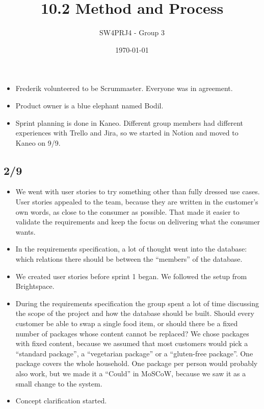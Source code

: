 \documentclass[a4paper,11pt]{article}
\title{10.2 Method and Process}
\author{SW4PRJ4 - Group 3}
\date{\today}
\begin{document}
\maketitle

\begin{itemize}
    \item Frederik volunteered to be Scrummaster. Everyone was in agreement.
    \item Product owner is a blue elephant named Bodil.
    \item Sprint planning is done in Kaneo. Different group members had different experiences with Trello and Jira, so we started in Notion and moved to Kaneo on 9/9.
\end{itemize}

\subsection*{2/9}
\begin{itemize}
    \item We went with user stories to try something other than fully dressed use cases. User stories appealed to the team, because they are written in the customer's own words, as close to the consumer as possible. That made it easier to validate the requirements and keep the focus on delivering what the consumer wants.
    \item In the requirements specification, a lot of thought went into the database: which relations there should be between the ``members'' of the database.
    \item We created user stories before sprint 1 began. We followed the setup from Brightspace.
    \item During the requirements specification the group spent a lot of time discussing the scope of the project and how the database should be built. Should every customer be able to swap a single food item, or should there be a fixed number of packages whose content cannot be replaced? We chose packages with fixed content, because we assumed that most customers would pick a ``standard package'', a ``vegetarian package'' or a ``gluten-free package''. One package covers the whole household. One package per person would probably also work, but we made it a ``Could'' in MoSCoW, because we saw it as a small change to the system.
    \item Concept clarification started.
\end{itemize}
\end{document}
